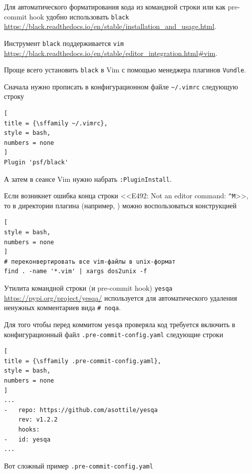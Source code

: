 \documentclass[%
	11pt,
	a4paper,
	utf8,
		]{article}
\begin{document}
Для автоматического форматирования кода из командной строки или как pre-commit hook удобно использовать \texttt{black} \url{https://black.readthedocs.io/en/stable/installation_and_usage.html}.

Инструмент \texttt{black} поддерживается \texttt{vim} \url{https://black.readthedocs.io/en/stable/editor_integration.html#vim}.

Проще всего установить \texttt{black} в Vim с помощью менеджера плагинов \texttt{Vundle}.

Сначала нужно прописать в конфигурационном файле \verb|~/.vimrc| следующую строку
\begin{lstlisting}[
title = {\sffamily ~/.vimrc},
style = bash,
numbers = none	
]
Plugin 'psf/black'
\end{lstlisting}

А затем в сеансе Vim нужно набрать \texttt{:PluginInstall}. 

Если возникнет ошибка конца строки <<E492: Not an editor command: \verb|^M|>>, то в директории плагина (например, ) можно воспользоваться конструкцией 
\begin{lstlisting}[
style = bash,
numbers = none	
]
# переконвертировать все vim-файлы в unix-формат
find . -name '*.vim' | xargs dos2unix -f
\end{lstlisting}

Утилита командной строки (и pre-commit hook) \texttt{yesqa} \url{https://pypi.org/project/yesqa/} используется для автоматического удаления ненужных комментариев вида \verb|# noqa|.

Для того чтобы перед коммитом \texttt{yesqa} проверяла код требуется включить в конфигурационный файл \texttt{.pre-commit-config.yaml} следующие строки
\begin{lstlisting}[
title = {\sffamily .pre-commit-config.yaml},
style = bash,
numbers = none	
]
...
-   repo: https://github.com/asottile/yesqa
    rev: v1.2.2
    hooks:
-   id: yesqa
...
\end{lstlisting}

Вот сложный пример \texttt{.pre-commit-config.yaml}
\end{document}
